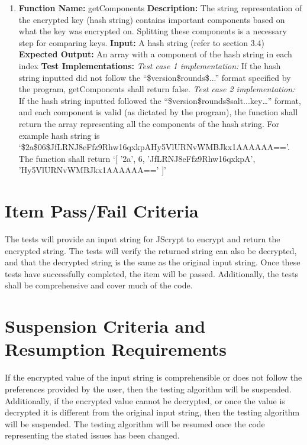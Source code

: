 \documentclass[12pt]{article}
\begin{document}
\begin{enumerate}
  \item
  \textbf{Function Name:} getComponents \newline
  \textbf{Description:} The string representation of the encrypted key (hash string) contains important components based on what the key was encrypted on. Splitting these components is a necessary step for comparing keys. \newline
  \textbf{Input:} A hash string (refer to section 3.4) \newline
  \textbf{Expected Output:} An array with a component of the hash string in each index  \newline
  \textbf{Test Implementations:} \newline
  \textit{Test case 1 implementation:} If the hash string inputted did not follow the “\$version\$rounds\$...” format specified by the program, getComponents shall return false. \newline
  \textit{Test case 2 implementation:} If the hash string inputted followed the “\$version\$rounds\$salt...key…” format, and each component is valid (as dictated by the program), the function shall return the array representing all the components of the hash string. For example hash string is `\$2a\$06\$JfLRNJ8eFfz9Rhw16qxkpAHy5VlURNvWMBJkx1AAAAAA=='. \newline The function shall return \newline `[ '2a', 6, 'JfLRNJ8eFfz9Rhw16qxkpA', 'Hy5VlURNvWMBJkx1AAAAAA==' ]'\newline

  \end{enumerate}
\section{Item Pass/Fail Criteria}
The tests will provide an input string for JScrypt to encrypt and return the encrypted string. The tests will verify the returned string can also be decrypted, and that the decrypted string is the same as the original input string. Once these tests have successfully completed, the item will be passed. Additionally, the tests shall be comprehensive and cover much of the code.

\section{Suspension Criteria and Resumption Requirements}
If the encrypted value of the input string is comprehensible or does not follow the preferences provided by the user, then the testing algorithm will be suspended. Additionally, if the encrypted value cannot be decrypted, or once the value is decrypted it is different from the original input string, then the testing algorithm will be suspended.
The testing algorithm will be resumed once the code representing the stated issues has been changed.
\end{document}
